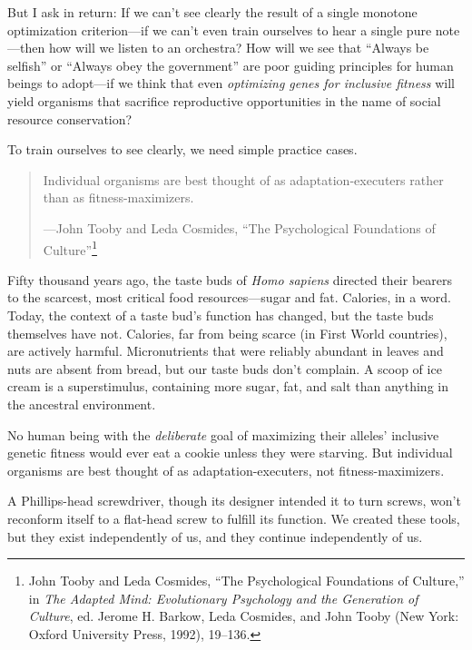 {
 But I ask in return: If we can't see clearly the
result of a single monotone optimization criterion---if we
can't even train ourselves to hear a single pure
note---then how will we listen to an orchestra? How will we see that
``Always be selfish'' or
``Always obey the government'' are
poor guiding principles for human beings to adopt---if we think that
even \textit{optimizing genes for inclusive fitness} will yield
organisms that sacrifice reproductive opportunities in the name of
social resource conservation?}

{
 To train ourselves to see clearly, we need simple practice cases.}

\myendsectiontext


\begin{quote}
{
 Individual organisms are best thought of as adaptation-executers
rather than as fitness-maximizers.}

{\raggedleft
 {}---John Tooby and Leda Cosmides,\newline
 ``The Psychological Foundations of
Culture''\footnote{John Tooby and Leda Cosmides, ``The
Psychological Foundations of Culture,'' in
\textit{The Adapted Mind: Evolutionary Psychology and the Generation of
Culture}, ed. Jerome H. Barkow, Leda Cosmides, and John Tooby (New
York: Oxford University Press, 1992), 19--136.}
\par}
\end{quote}


{
 Fifty thousand years ago, the taste buds of \textit{Homo sapiens}
directed their bearers to the scarcest, most critical food
resources---sugar and fat. Calories, in a word. Today, the context of a
taste bud's function has changed, but the taste buds
themselves have not. Calories, far from being scarce (in First World
countries), are actively harmful. Micronutrients that were reliably
abundant in leaves and nuts are absent from bread, but our taste buds
don't complain. A scoop of ice cream is a
superstimulus, containing more sugar, fat, and salt than anything in
the ancestral environment.}

{
 No human being with the \textit{deliberate} goal of maximizing
their alleles' inclusive genetic fitness would ever eat
a cookie unless they were starving. But individual organisms are best
thought of as adaptation-executers, not fitness-maximizers.}

{
 A Phillips-head screwdriver, though its designer intended it to
turn screws, won't reconform itself to a flat-head
screw to fulfill its function. We created these tools, but they exist
independently of us, and they continue independently of us.}

